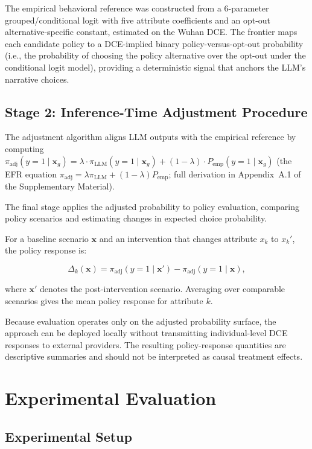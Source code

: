 \documentclass[11pt]{article}
\begin{document}
The empirical behavioral reference was constructed from a 6-parameter grouped/conditional logit with five attribute coefficients and an opt-out alternative-specific constant, estimated on the Wuhan DCE. The frontier maps each candidate policy to a DCE-implied binary policy-versus-opt-out probability (i.e., the probability of choosing the policy alternative over the opt-out under the conditional logit model), providing a deterministic signal that anchors the LLM's narrative choices.

\subsection{Stage 2: Inference-Time Adjustment Procedure} The adjustment algorithm aligns LLM outputs with the empirical reference by computing $\pi_{\mathrm{adj}}(y=1\mid\mathbf{x}_g) = \lambda \cdot \pi_{\mathrm{LLM}}(y=1\mid\mathbf{x}_g) + (1-\lambda) \cdot P_{\mathrm{emp}}(y=1\mid\mathbf{x}_g)$ (the EFR equation $\pi_{\mathrm{adj}} = \lambda \pi_{\mathrm{LLM}} + (1-\lambda) P_{\mathrm{emp}}$; full derivation in Appendix~A.1 of the Supplementary Material).
\label{sec:stage3}

The final stage applies the adjusted probability to policy evaluation, comparing policy scenarios and estimating changes in expected choice probability.

For a baseline scenario $\mathbf{x}$ and an intervention that changes attribute $x_k$ to $x_k'$, the policy response is:

\[
\Delta_k(\mathbf{x}) = \pi_{\mathrm{adj}}(y=1\mid\mathbf{x}') - \pi_{\mathrm{adj}}(y=1\mid\mathbf{x}),
\]

where $\mathbf{x}'$ denotes the post-intervention scenario. Averaging over comparable scenarios gives the mean policy response for attribute $k$.

Because evaluation operates only on the adjusted probability surface, the approach can be deployed locally without transmitting individual-level DCE responses to external providers. The resulting policy-response quantities are descriptive summaries and should not be interpreted as causal treatment effects.



\clearpage

\clearpage
\section{Experimental Evaluation}

\subsection{Experimental Setup}
\label{sec:setup}
\end{document}
